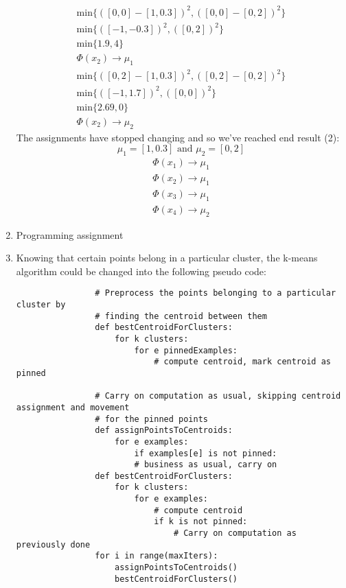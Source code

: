 \documentclass[12pt]{article}
\begin{document}
\begin{enumerate}[label=(\alph*)]
			\begin{gather*}
				\text{min} \{ ( [0,0] - [1, 0.3] )^2, ( [0,0] - [0, 2] )^2\} \\
				\text{min} \{ ( [-1,-0.3] )^2, ( [0, 2] )^2\} \\
				\text{min} \{ 1.9, 4\} \\
				\Phi(x_2) \rightarrow \mu_1
			\end{gather*}
			\begin{gather*}
				\text{min} \{ ( [0,2] - [1, 0.3] )^2, ( [0,2] - [0, 2] )^2\} \\
				\text{min} \{ ( [-1,1.7] )^2, ( [0, 0] )^2\} \\
				\text{min} \{ 2.69, 0\} \\
				\Phi(x_2) \rightarrow \mu_2
			\end{gather*}
			The assignments have stopped changing and so we've reached end result (2):
			\[
				\mu_1 = [1, 0.3] \text{ and } \mu_2 = [0, 2]
			\]
			\begin{gather*}
				\Phi(x_1) \rightarrow \mu_1 \\
				\Phi(x_2) \rightarrow \mu_1 \\
				\Phi(x_3) \rightarrow \mu_1 \\
				\Phi(x_4) \rightarrow \mu_2
			\end{gather*}


		\item Programming assignment
		\item Knowing that certain points belong in a particular cluster, the k-means
			algorithm could be changed into the following pseudo code:

			\begin{verbatim}
				# Preprocess the points belonging to a particular cluster by
				# finding the centroid between them
				def bestCentroidForClusters:
					for k clusters:
						for e pinnedExamples:
							# compute centroid, mark centroid as pinned

				# Carry on computation as usual, skipping centroid assignment and movement
				# for the pinned points
				def assignPointsToCentroids:
					for e examples:
						if examples[e] is not pinned:
						# business as usual, carry on
				def bestCentroidForClusters:
					for k clusters:
						for e examples:
							# compute centroid
							if k is not pinned:
								# Carry on computation as previously done
				for i in range(maxIters):
					assignPointsToCentroids()
					bestCentroidForClusters()
			\end{verbatim}
	\end{enumerate}
\end{document}
